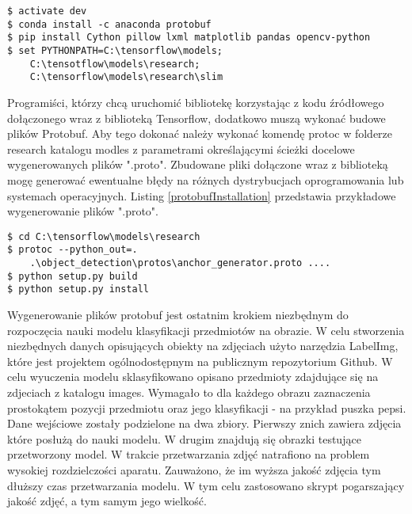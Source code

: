 \begin{lstlisting}[caption={Instalacja bibliotek.}, label={terminalConfiguration} ]
$ activate dev
$ conda install -c anaconda protobuf
$ pip install Cython pillow lxml matplotlib pandas opencv-python
$ set PYTHONPATH=C:\tensorflow\models;
	C:\tensotflow\models\research;
	C:\tensorflow\models\research\slim
\end{lstlisting}

Programiści, którzy chcą uruchomić bibliotekę korzystając z kodu źródłowego dołączonego wraz z biblioteką Tensorflow, dodatkowo muszą wykonać budowe plików Protobuf. Aby tego dokonać należy wykonać komendę protoc w folderze research katalogu modles z parametrami określającymi ścieżki docelowe wygenerowanych plików ".proto". Zbudowane pliki dołączone wraz z biblioteką mogę generować ewentualne błędy na różnych dystrybucjach oprogramowania lub systemach operacyjnych. Listing \ref{protobufInstallation} przedstawia przykładowe wygenerowanie plików ".proto".

\begin{lstlisting}[caption={generowanie plików protobuf.}, label={protobufInstallation} ]
$ cd C:\tensorflow\models\research
$ protoc --python_out=. 
	.\object_detection\protos\anchor_generator.proto ....
$ python setup.py build
$ python setup.py install
\end{lstlisting}

Wygenerowanie plików protobuf jest ostatnim krokiem niezbędnym do rozpoczęcia nauki modelu klasyfikacji przedmiotów na obrazie. W celu stworzenia niezbędnych danych opisujących obiekty na zdjęciach użyto narzędzia LabelImg, które jest projektem ogólnodostępnym na publicznym repozytorium Github. W celu wyuczenia modelu sklasyfikowano opisano przedmioty zdajdujące się na zdjeciach z katalogu images. Wymagało to dla każdego obrazu zaznaczenia prostokątem pozycji przedmiotu oraz jego klasyfikacji - na przykład puszka pepsi. Dane wejściowe zostały podzielone na dwa zbiory. Pierwszy znich zawiera zdjęcia które posłużą do nauki modelu. W drugim znajdują się obrazki testujące przetworzony model. W trakcie przetwarzania zdjęć natrafiono na problem wysokiej rozdzielczości aparatu. Zauważono, że im wyższa jakość zdjęcia tym dłuższy czas przetwarzania modelu. W tym celu zastosowano skrypt pogarszający jakość zdjęć, a tym samym jego wielkość. 

